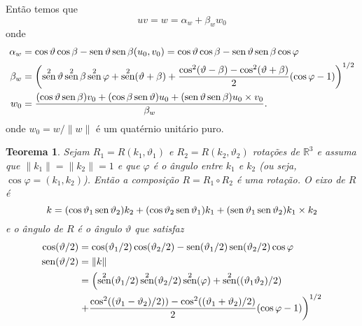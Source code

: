 \documentclass[12pt]{amsart}
\newcommand{\R}{\mathbb R}
\DeclareMathOperator{\sen}{\textrm{\rm sen}}
\newtheorem{theorem}{Teorema}
\theoremstyle{definition}
\begin{document}
Então temos que 
\[
    uv=w=\alpha_w+\beta_ww_0
\]
onde
\begin{align*}
    \alpha_w&= \cos\vartheta\cos\beta-\sen\vartheta\sen\beta(u_0,v_0)=\cos\vartheta\cos\beta-\sen\vartheta\sen\beta\cos\varphi\\
    \beta_w&=\left(\sen^2\vartheta\sen^2\beta\sen^2\varphi+\sen^2(\vartheta+\beta)+\frac{\cos^2(\vartheta-\beta)-\cos^2(\vartheta+\beta)}{2}(\cos\varphi-1)\right)^{1/2}\\
    w_0&=\frac{(\cos\vartheta\sen\beta) v_0+(\cos\beta\sen\vartheta) u_0+(\sen\vartheta\sen\beta)u_0\times v_0}{\beta_w}.
\end{align*} 
onde $w_0=w/\|w\|$ é um quatérnio unitário puro.

\begin{theorem}
    Sejam $R_1=R(k_1,\vartheta_1)$ e $R_2=R(k_2,\vartheta_2)$ rotações de $\R^3$ e assuma que 
    $\|k_1\|=\|k_2\|=1$ e que $\varphi$ é o ângulo entre $k_1$ e $k_2$ (ou seja, $\cos\varphi=(k_1,k_2)$). Então a composição 
    $R=R_1\circ R_2$ é uma rotação. O eixo de $R$ é
    \[
        k=(\cos\vartheta_1\sen\vartheta_2) k_2+(\cos\vartheta_2\sen\vartheta_1) k_1+
        (\sen\vartheta_1\sen\vartheta_2)k_1\times k_2
    \] 
    e o ângulo de $R$ é o ângulo $\vartheta$ que satisfaz 
    \begin{align*}
        \cos(\vartheta/2)&=\cos(\vartheta_1/2)\cos(\vartheta_2/2)-\sen(\vartheta_1/2)\sen(\vartheta_2/2)\cos\varphi\\
        \sen(\vartheta/2)&=\|k\|\\&=\left(\sen^2(\vartheta_1/2)\sen^2(\vartheta_2/2)\sen^2(\varphi)+\sen^2((\vartheta_1\vartheta_2)/2)\right.\\
        &\left.+\frac{\cos^2((\vartheta_1-\vartheta_2)/2))-\cos^2((\vartheta_1+\vartheta_2)/2)}{2}(\cos\varphi-1)\right)^{1/2}
    \end{align*}

\end{theorem}
\end{document}
